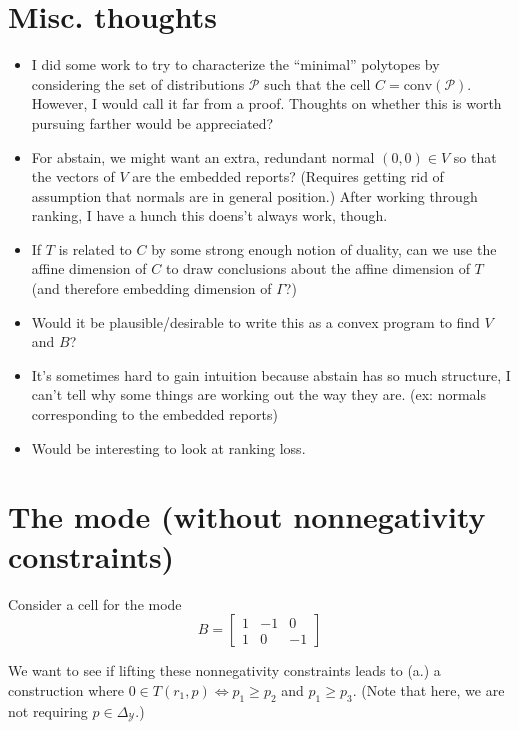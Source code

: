 \documentclass[12pt]{article}
\renewcommand{\P}{\mathcal{P}}
\newcommand{\Y}{\mathcal{Y}}
\newcommand{\conv}{\mathrm{conv}}
\newcommand{\simplex}{\Delta_\Y}
\begin{document}
\section{Misc. thoughts}
\begin{itemize}
	\item I did some work to try to characterize the ``minimal'' polytopes by considering the set of distributions $\P$ such that the cell $C = \conv(\P)$.
	However, I would call it far from a proof.
	Thoughts on whether this is worth pursuing farther would be appreciated?
	
	\item For abstain, we might want an extra, redundant normal $(0,0) \in V$ so that the vectors of $V$ are the embedded reports?  
	(Requires getting rid of assumption that normals are in general position.)
	After working through ranking, I have a hunch this doens't always work, though.
	
	\item If $T$ is related to $C$ by some strong enough notion of duality, can we use the affine dimension of $C$ to draw conclusions about the affine dimension of $T$ (and therefore embedding dimension of $\Gamma$?) 
	
	\item Would it be plausible/desirable to write this as a convex program to find $V$ and $B$?

	\item It's sometimes hard to gain intuition because abstain has so much structure, I can't tell why some things are working out the way they are. (ex: normals corresponding to the embedded reports)
	
	\item Would be interesting to look at ranking loss.
	
\end{itemize}

\newpage
\section*{The mode (without nonnegativity constraints)}
Consider a cell for the mode
\[
B = \begin{bmatrix*}
1 & -1 & 0 \\
1 & 0 & -1 
\end{bmatrix*}
\]

We want to see if lifting these nonnegativity constraints leads to (a.) a construction where $0 \in T(r_1, p) \iff p_1 \geq p_2$ and $p_1 \geq p_3$.
(Note that here, we are not requiring $p \in \simplex$.)
\end{document}
